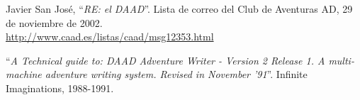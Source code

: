 \documentclass[11pt, a5paper]{article}
\begin{document}
\begin{thebibliography}{99}
  Javier San José,
  ``\emph{RE: el DAAD}''.
  Lista de correo del Club de Aventuras AD,
  29 de noviembre de 2002.\\
  \url{http://www.caad.es/listas/caad/msg12353.html}

  ``\emph{A Technical guide to: DAAD Adventure Writer - Version 2 Release 1. A multi-machine adventure writing system. Revised in November '91}''.
  Infinite Imaginations,
  1988-1991.

\end{thebibliography}
\end{document}
